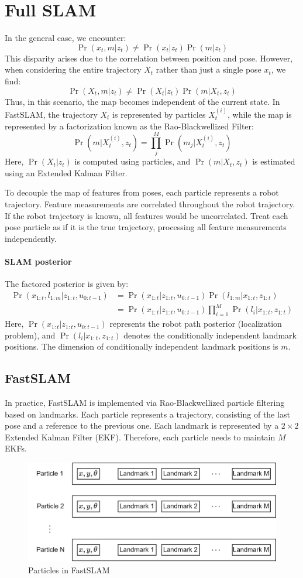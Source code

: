 \section{Full SLAM}

In the general case, we encounter:
\[\Pr(x_t,m|z_t)\neq \Pr(x_t|z_t)\Pr(m|z_t)\]
This disparity arises due to the correlation between position and pose.
However, when considering the entire trajectory $X_t$ rather than just a single pose $x_t$, we find:
\[\Pr(X_t,m|z_t)\neq \Pr(X_t|z_t)\Pr(m|X_t,z_t)\]
Thus, in this scenario, the map becomes independent of the current state.
In FastSLAM, the trajectory $X_t$ is represented by particles $X_t^{(i)}$, while the map is represented by a factorization known as the Rao-Blackwellized Filter:
\[\Pr\left(m|X_t^{(i)},z_t\right)=\prod_j^M\Pr\left(m_j|X_t^{(i)},z_t\right)\]
Here, $\Pr\left(X_t|z_t\right)$ is computed using particles, and $\Pr\left(m|X_t,z_t\right)$ is estimated using an Extended Kalman Filter.

To decouple the map of features from poses, each particle represents a robot trajectory. 
Feature measurements are correlated throughout the robot trajectory.
If the robot trajectory is known, all features would be uncorrelated. 
Treat each pose particle as if it is the true trajectory, processing all feature measurements independently.

\paragraph*{SLAM posterior}
The factored posterior is given by:
\begin{align*}
    \Pr(x_{1:t},l_{1:m}|z_{1:t},u_{0:t-1})  &=\Pr(x_{1:t}|z_{1:t},u_{0:t-1})\Pr(l_{1:m}|x_{1:t},z_{1:t}) \\
                                            &=\Pr(x_{1:t}|z_{1:t},u_{0:t-1})\prod_{i=1}^{M}\Pr(l_{i}|x_{1:t},z_{1:t})
\end{align*}
Here, $\Pr(x_{1:t}|z_{1:t},u_{0:t-1})$ represents the robot path posterior (localization problem), and $\Pr(l_{i}|x_{1:t},z_{1:t})$ denotes the conditionally independent landmark positions. 
The dimension of conditionally independent landmark positions is $m$.

\subsection{FastSLAM}
In practice, FastSLAM is implemented via Rao-Blackwellized particle filtering based on landmarks. 
Each particle represents a trajectory, consisting of the last pose and a reference to the previous one. 
Each landmark is represented by a $2\times 2$ Extended Kalman Filter (EKF). 
Therefore, each particle needs to maintain $M$ EKFs.
\begin{figure}[H]
    \centering
    \includegraphics[width=0.4\linewidth]{images/fast.png}
    \caption{Particles in FastSLAM}
\end{figure}

